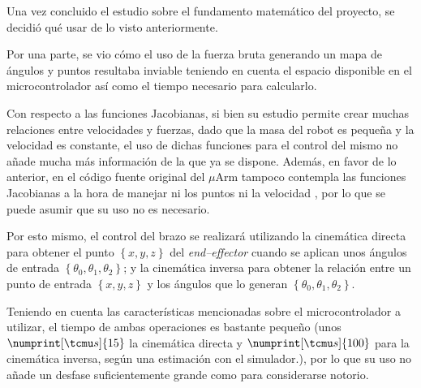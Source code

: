 Una vez concluido el estudio sobre el fundamento matemático del proyecto, se decidió
qué usar de lo visto anteriormente.

Por una parte, se vio cómo el uso de la fuerza bruta generando un mapa de ángulos
y puntos resultaba inviable teniendo en cuenta el espacio disponible en el microcontrolador
así como el tiempo necesario para calcularlo.

Con respecto a las funciones Jacobianas, si bien su estudio permite crear muchas
relaciones entre velocidades y fuerzas, dado que la masa del robot es pequeña y la
velocidad es constante, el uso de dichas funciones para el control del mismo no añade
mucha más información de la que ya se dispone. Además, en favor de lo anterior, en el
código fuente original del $\mu$Arm tampoco contempla las funciones Jacobianas a la hora
de manejar ni los puntos ni la velocidad \cite{UArmDeveloperSwiftProForArduino}, por lo
que se puede asumir que su uso no es necesario.

Por esto mismo, el control del brazo se realizará utilizando la cinemática directa
para obtener el punto $\left\{x, y, z\right\}$ del \textit{end--effector} cuando se
aplican unos ángulos de entrada $\left\{\theta_0, \theta_1, \theta_2\right\}$; y la
cinemática inversa para obtener la relación entre un punto de entrada $\left\{x, y, z\right\}$
y los ángulos que lo generan $\left\{\theta_0, \theta_1, \theta_2\right\}$.

Teniendo en cuenta las características mencionadas sobre el microcontrolador a utilizar,
el tiempo de ambas operaciones es bastante pequeño (unos $\numprint[\tcmu s]{15}$ la
cinemática directa y $\numprint[\tcmu s]{100}$ para la cinemática inversa, según una
estimación con el simulador.), por lo que su uso no añade un desfase suficientemente
grande como para considerarse notorio.